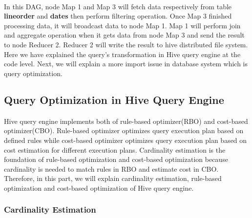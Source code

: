         \paragraph{}
        In this DAG, node Map 1 and Map 3 will fetch data respectively from table \textbf{lineorder} and \textbf{dates} then 
        perform filtering operation. Once Map 3 finished processing data, it will broadcast data to node Map 1. 
        Map 1 will perform join and aggregate operation when it gets data from node Map 3 and send the result to 
        node Reducer 2. Reducer 2 will write the result to hive distributed file system. Here we have explained the query's transformation 
        in Hive query engine at the code level. Next, we will explain a more import issue in database system which 
        is query optimization.

    \subsection{Query Optimization in Hive Query Engine}
        \paragraph{}
        Hive query engine implements both of rule-based optimizer(RBO) and cost-based optimizer(CBO). Rule-based 
        optimizer optimizes query execution plan based on defined rules while cost-based optimizer optimizes query execution 
        plan based on cost estimation for different execution plans. Cardinality estimation is the foundation of 
        rule-based optimization and cost-based optimization because cardinality is needed to match rules in RBO and estimate 
        cost in CBO. Therefore, in this part, we will explain cardinality estimation, rule-based optimization and cost-based 
        optimization of Hive query engine.
        \subsubsection{Cardinality Estimation}
